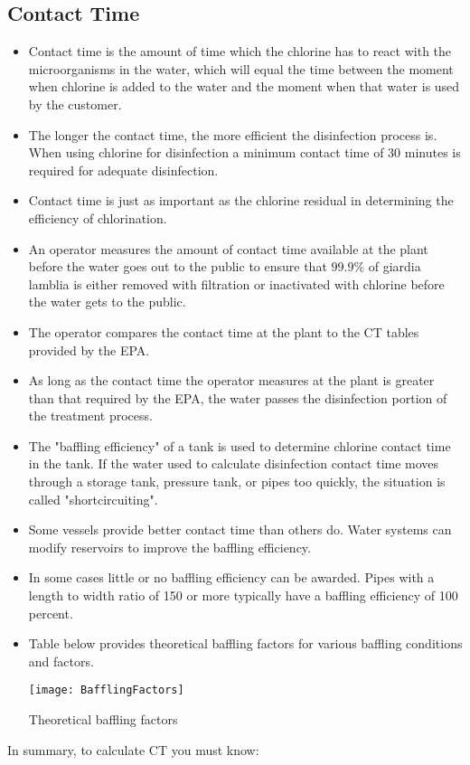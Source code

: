 \subsection{Contact Time}
\begin{itemize}
\item Contact time is the amount of time which the chlorine has to react with the microorganisms in the water, which will equal the time between the moment when chlorine is added to the water and the moment when that water is used by the customer.
\item The longer the contact time, the more efficient the disinfection process is. When using chlorine for disinfection a minimum contact time of 30 minutes is required for adequate disinfection.
\item Contact time is just as important as the chlorine residual in determining the efficiency of chlorination.  
\item An operator measures the amount of contact time available at the plant before the water goes out to the public to ensure that $99.9 \%$ of giardia lamblia is either removed with filtration or inactivated with chlorine before the water gets to the public. 
\item The operator compares the contact time at the plant to the CT tables provided by the EPA.
\item As long as the contact time the operator measures at the plant is greater than that required by the EPA, the water passes the disinfection portion of the treatment process.

\item The "baffling efficiency" of a tank is used to determine chlorine contact time in the tank. If the water used to calculate disinfection contact time moves through a storage tank, pressure tank, or pipes too quickly, the situation is called "shortcircuiting". 
\item Some vessels provide better contact time than others do. Water systems can modify reservoirs to improve the baffling efficiency. 
\item In some cases little or no baffling efficiency can be awarded. Pipes with a length to width ratio of 150 or more typically have a baffling efficiency of 100 percent.
\item Table below provides theoretical baffling factors for various baffling conditions and factors.
\begin{table}[h!]
  \texttt{[image: BafflingFactors]}
    \caption{Theoretical baffling factors}
\end{table}
\end{itemize}
In summary, to calculate CT you must know:

